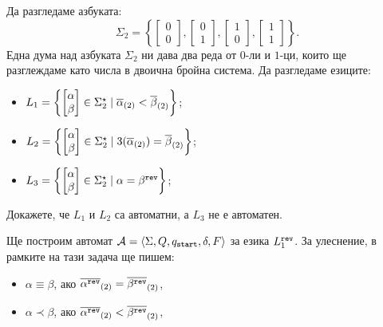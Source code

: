 \begin{extra2}

    \begin{problem}
  Да разгледаме азбуката:
  \[\Sigma_2 = \left\{\begin{bmatrix} 0\\0\end{bmatrix},\begin{bmatrix} 0\\1\end{bmatrix},\begin{bmatrix} 1\\0\end{bmatrix},\begin{bmatrix} 1\\1\end{bmatrix}\right\}.\]
  Една дума над азбуката $\Sigma_2$ ни дава два реда от $0$-ли и $1$-ци, които ще разглеждаме като числа в двоична бройна система.
  Да разгледаме езиците:
  \begin{itemize}
  \item 
    $L_1 = \left\{\begin{bmatrix} \alpha\\ \beta \end{bmatrix} \in \Sigma^\star_2 \mid \overline{\alpha}_{(2)} < \overline{\beta}_{(2)}\right\}$;
  \item
    $L_2 = \left\{\begin{bmatrix} \alpha\\ \beta \end{bmatrix} \in \Sigma^\star_2 \mid 3(\overline{\alpha}_{(2)}) = \overline{\beta}_{(2)}\right\}$;
  \item
    $L_3 = \left\{\begin{bmatrix} \alpha\\ \beta \end{bmatrix} \in \Sigma^\star_2 \mid \alpha = \beta^{\texttt{rev}}\right\}$;
  \end{itemize}
  Докажете, че  $L_1$ и $L_2$ са автоматни, а $L_3$ не е автоматен.
\end{problem}
\ifhints
\begin{hint}
  Ще построим автомат $\mathcal{A} = \langle{\Sigma,Q,q_{\texttt{start}},\delta,F}\rangle$ за езика $L^{\texttt{rev}}_1$.
  За улеснение, в рамките на тази задача ще пишем:
  \begin{itemize}
  \item 
    $\alpha \equiv \beta$, ако $\overline{\alpha^{\texttt{rev}}}_{(2)} = \overline{\beta^{\texttt{rev}}}_{(2)}$,
  \item
    $\alpha \prec \beta$, ако $\overline{\alpha^{\texttt{rev}}}_{(2)} < \overline{\beta^{\texttt{rev}}}_{(2)}$,

\end{itemize}
\end{hint}
\end{extra2}
